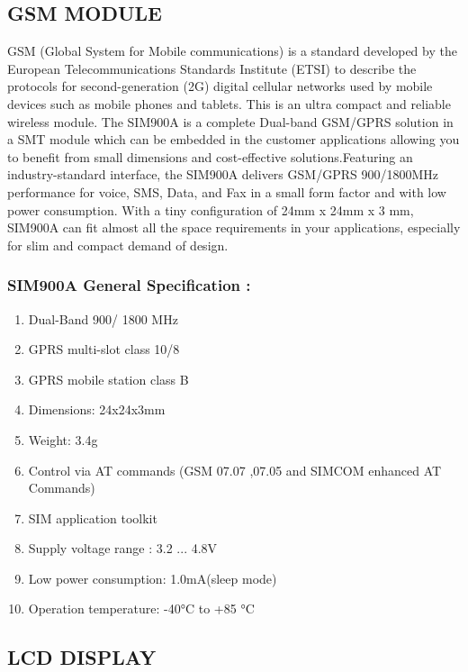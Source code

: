 \documentclass[12pt,a4paper]{report}
\begin{document}
\newpage
\subsection{GSM MODULE}


\hspace*{1cm} GSM (Global System for Mobile communications) is a standard developed by the European Telecommunications Standards Institute (ETSI) to describe the protocols for second-generation (2G) digital cellular networks used by mobile devices such as mobile phones and tablets.
This is an ultra compact and reliable wireless module. The SIM900A is a complete Dual-band GSM/GPRS solution in a SMT module which can be embedded in the customer applications allowing you to benefit from small dimensions and cost-effective solutions.Featuring an industry-standard interface, the SIM900A delivers GSM/GPRS 900/1800MHz performance for voice, SMS, Data, and Fax in a small form factor and with low power consumption. With a tiny configuration of 24mm x 24mm x 3 mm, SIM900A can fit almost all the space requirements in your applications, especially for slim and compact demand of design. 
\subsubsection{SIM900A General Specification :}
\begin{enumerate}
 
\item 	Dual-Band 900/ 1800 MHz
\item 	GPRS multi-slot class 10/8
\item 	GPRS mobile station class B
\item 	Dimensions: 24x24x3mm

\item 	Weight: 3.4g
\item 	Control via AT commands (GSM 07.07 ,07.05 and SIMCOM enhanced AT Commands)
\item 	SIM application toolkit
\item 	Supply voltage range : 3.2 ... 4.8V
\item Low power consumption: 1.0mA(sleep mode)
\item Operation temperature: -40°C to +85 °C
 \end{enumerate}


\newpage


\subsection{LCD DISPLAY}
\end{document}
